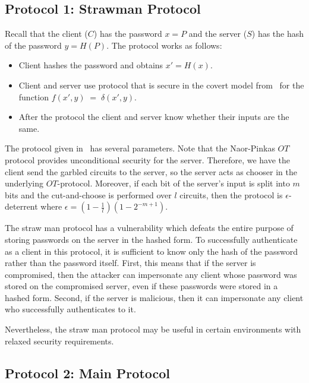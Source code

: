 \subsection{Protocol 1: Strawman Protocol}
\label{subsec:protocol-1}

Recall that the client ($C$) has the password $x=P$ and the server
($S$) has the hash of the password $y=H(P)$. The protocol works as
follows:
\begin{itemize}
\item Client hashes the password and obtains $x'=H(x)$.
\item Client and server use protocol that is secure in the covert
model from~\cite[Section 6.2]{aumannlindell} for the function $f(x',y)
\; = \; \delta (x',y)$.
\item After the protocol the client and server know whether their
inputs are the same.
\end{itemize}
The protocol given in~\cite{aumannlindell} has several
parameters. Note that the Naor-Pinkas $OT$ protocol provides
unconditional security for the server. Therefore, we have the client
send the garbled circuits to the server, so the server acts as chooser
in the underlying $OT$-protocol. Moreover, if each bit of the server's
input is split into $m$ bits and the cut-and-choose is performed over
$l$ circuits, then the protocol is $\epsilon$-deterrent where
$\epsilon = (1 - \frac{1}{l}) (1 - 2^{-m+1})$.

The straw man protocol has a vulnerability which defeats the entire
purpose of storing passwords on the server in the hashed form.  To
successfully authenticate as a client in this protocol, it is
sufficient to know only the hash of the password rather than the
password itself.  First, this means that if the server is compromised,
then the attacker can impersonate any client whose password was stored
on the compromised server, even if these passwords were stored in a
hashed form.  Second, if the server is malicious, then it can
impersonate any client who successfully authenticates to it.

Nevertheless, the straw man protocol may be useful in certain environments
with relaxed security requirements.



\subsection{Protocol 2: Main Protocol}
\label{sect:mainproto}

